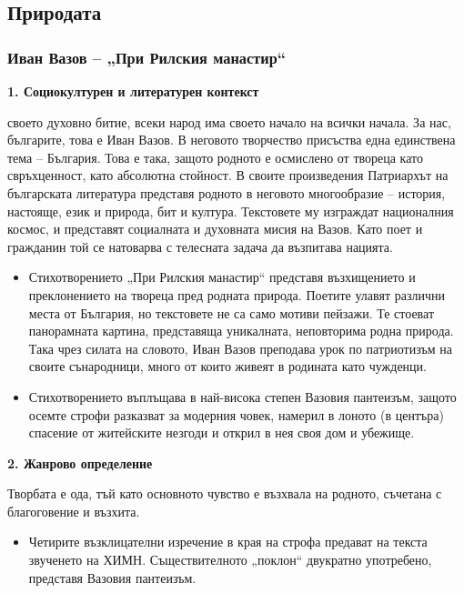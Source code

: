 \documentclass[12pt,a4paper]{article}
\begin{document}
\subsection{Природата}
\subsubsection{\colorbox{green!40}{Иван Вазов – „При Рилския манастир“}}
\textbf{1. Социокултурен и литературен контекст}
\vspace{0.1cm}

 своето духовно битие, всеки народ има своето начало на всички начала. За нас, българите, това е Иван Вазов. В неговото творчество присъства една единствена тема – България. Това е така, защото родното е осмислено от твореца като свръхценност, като абсолютна стойност. В своите произведения Патриархът на българската литература представя родното в неговото многообразие – история, настояще, език и природа, бит и култура. Текстовете му изграждат националния космос, и представят социалната и духовната мисия на Вазов. Като поет и гражданин той се натоварва с телесната задача да възпитава нацията.

\vspace{0.1cm}
\begin{itemize}[leftmargin=*, noitemsep, topsep=2pt, parsep=0pt]
    \item Стихотворението „При Рилския манастир“ представя възхищението и преклонението на твореца пред родната природа. Поетите улавят различни места от България, но текстовете не са само мотиви пейзажи. Те стоеват панорамната картина, представяща уникалната, неповторима родна природа. Така чрез силата на словото, Иван Вазов преподава урок по патриотизъм на своите сънародници, много от които живеят в родината като чужденци.
    \vspace{0.1cm}
    \item Стихотворението въплъщава в най-висока степен Вазовия пантеизъм, защото осемте строфи разказват за модерния човек, намерил в лоното (в центъра) спасение от житейските незгоди и открил в нея своя дом и убежище.
\end{itemize}

\vspace{0.1cm}
\textbf{2. Жанрово определение}
\vspace{0.1cm}

\indent Творбата е ода, тъй като основното чувство е възхвала на родното, съчетана с благоговение и възхита.
 
\vspace{0.1cm}
\begin{itemize}[leftmargin=*, noitemsep, topsep=2pt, parsep=0pt]
    \item Четирите възклицателни изречение в края на строфа предават на текста звученето на ХИМН. Съществителното „поклон“ двукратно употребено, представя Вазовия пантеизъм.
\end{itemize}
\end{document}

